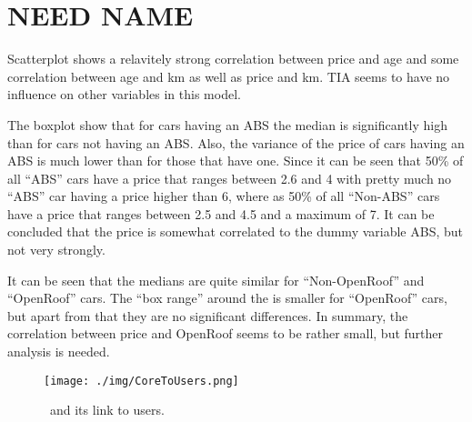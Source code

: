 \section{NEED NAME} %
\label{sec:need_name}

Scatterplot shows a relavitely strong correlation between price and age and some correlation between age and km as well as price and km. TIA seems to have no influence on other variables in this model.

The boxplot show that for cars having an ABS the median is significantly high than for cars not having an ABS. Also, the variance of the price of cars having an ABS is much lower than for those that have one.
Since it can be seen that 50\% of all ``ABS'' cars have a price that ranges between 2.6 and 4 with pretty much no ``ABS'' car having a price higher than 6, where as 50\% of all ``Non-ABS'' cars have a price that ranges between 2.5 and 4.5 and a maximum of 7. It can be concluded that the price is somewhat correlated to the dummy variable ABS, but not very strongly.

It can be seen that the medians are quite similar for ``Non-OpenRoof'' and ``OpenRoof'' cars. The ``box range'' around the is smaller for ``OpenRoof'' cars, but apart from that they are no significant differences. In summary, the correlation between price and OpenRoof seems to be rather small, but further analysis is needed.

\begin{figure}[H]
  \begin{center}
    \texttt{[image: ./img/CoreToUsers.png]}
    \end{center}
  \caption{\umld \Core~and its link to users.}
  \label{fig:core_users_uml}
\end{figure}


